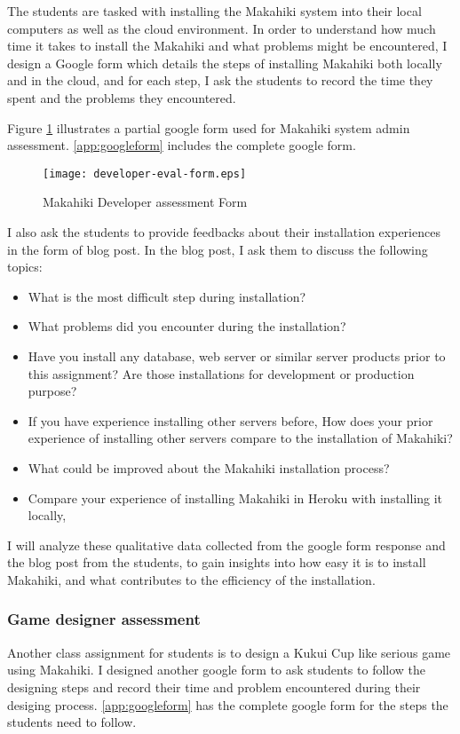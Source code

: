 The students are tasked with installing the Makahiki system into their local computers as well as the cloud environment. In order to understand how much time it takes to install the Makahiki and what problems might be encountered, I design a Google form which details the steps of installing Makahiki both locally and in the cloud, and for each step, I ask the students to record the time they spent and the problems they encountered.

Figure \ref{fig:developer-eval-form} illustrates a partial google form used for Makahiki system admin assessment. \autoref{app:googleform} includes the complete google form.
\begin{figure}[ht!]
   \centering
   \texttt{[image: developer-eval-form.eps]}
   \caption{Makahiki Developer assessment Form}
   \label{fig:developer-eval-form}
\end{figure}

I also ask the students to provide feedbacks about their installation experiences in the form of blog post. In the blog post, I ask them to discuss the following topics:
\begin{itemize}
\item What is the most difficult step during installation?
\item What problems did you encounter during the installation?
\item Have you install any database, web server or similar server products prior to this assignment? Are those installations for development or production purpose?
\item If you have experience installing other servers before, How does your prior experience of installing other servers compare to the installation of Makahiki?
\item What could be improved about the Makahiki installation process?
\item Compare your experience of installing Makahiki in Heroku with installing it locally,
\end{itemize}

I will analyze these qualitative data collected from the google form response and the blog post from the students, to gain insights into how easy it is to install Makahiki, and what contributes to the efficiency of the installation.

\subsubsection{Game designer assessment}
Another class assignment for students is to design a Kukui Cup like serious game using Makahiki. I designed another google form to ask students to follow the designing steps and record their time and problem encountered during their desiging process. \autoref{app:googleform} has the complete google form for the steps the students need to follow.

